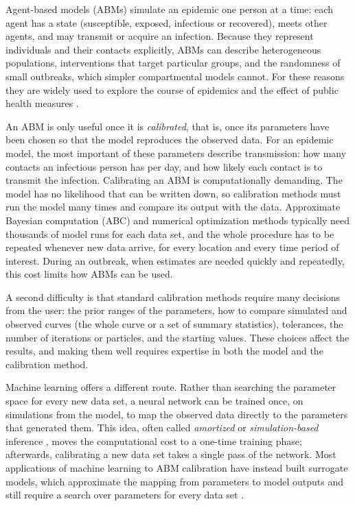 \documentclass[12pt]{article}
\begin{document}
Agent-based models (ABMs) simulate an epidemic one person at a time: each agent has a state
(susceptible, exposed, infectious or recovered), meets other agents, and may transmit or acquire
an infection. Because they represent individuals and their contacts explicitly, ABMs can describe
heterogeneous populations, interventions that target particular groups, and the randomness of
small outbreaks, which simpler compartmental models cannot. For these reasons they are widely used
to explore the course of epidemics and the effect of public health measures
\autocite{railsbackAgentbasedIndividualbasedModeling2019}.

An ABM is only useful once it is \emph{calibrated}, that is, once its parameters have been chosen
so that the model reproduces the observed data. For an epidemic model, the most important of these
parameters describe transmission: how many contacts an infectious person has per day, and how
likely each contact is to transmit the infection. Calibrating an ABM is computationally demanding.
The model has no likelihood that can be written down, so calibration methods must run the model
many times and compare its output with the data. Approximate Bayesian computation (ABC) and
numerical optimization methods typically need thousands of model runs for each data set, and the
whole procedure has to be repeated whenever new data arrive, for every location and every time
period of interest. During an outbreak, when estimates are needed quickly and repeatedly, this cost
limits how ABMs can be used.

A second difficulty is that standard calibration methods require many decisions from the user:
the prior ranges of the parameters, how to compare simulated and observed curves (the whole curve
or a set of summary statistics), tolerances, the number of iterations or particles, and the
starting values. These choices affect the results, and making them well requires expertise in
both the model and the calibration method.

Machine learning offers a different route. Rather than searching the parameter space for every new
data set, a neural network can be trained once, on simulations from the model, to map the observed
data directly to the parameters that generated them. This idea, often called \emph{amortized} or
\emph{simulation-based} inference \autocite{cranmer2020frontier,radev2022bayesflow}, moves the
computational cost to a one-time training phase; afterwards, calibrating a new data set takes a
single pass of the network. Most applications of machine learning to ABM calibration have instead
built surrogate models, which approximate the mapping from parameters to model outputs and still
require a search over parameters for every data set
\autocite{Angione2022-surrogate,lamperti2017agentbasedmodelcalibrationusing}.
\end{document}

